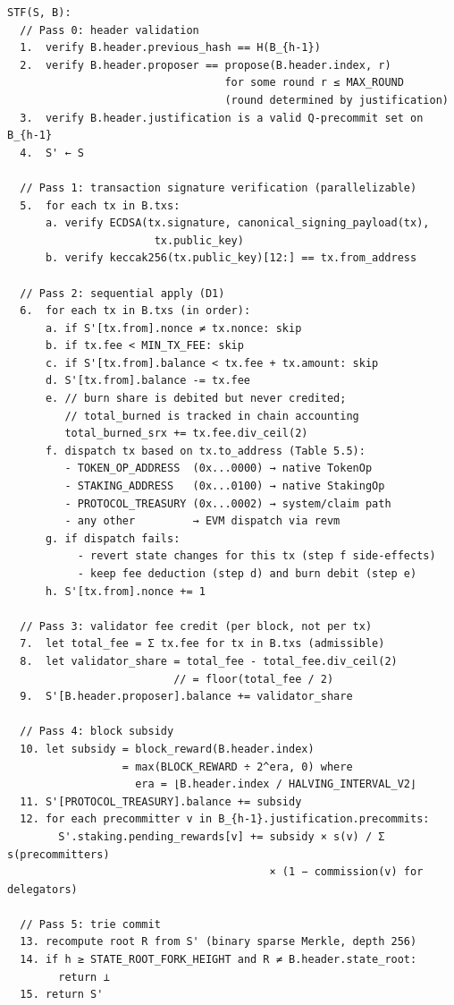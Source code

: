 \documentclass[11pt,a4paper]{article}
\begin{document}
\begin{verbatim}
STF(S, B):
  // Pass 0: header validation
  1.  verify B.header.previous_hash == H(B_{h-1})
  2.  verify B.header.proposer == propose(B.header.index, r)
                                  for some round r ≤ MAX_ROUND
                                  (round determined by justification)
  3.  verify B.header.justification is a valid Q-precommit set on B_{h-1}
  4.  S' ← S

  // Pass 1: transaction signature verification (parallelizable)
  5.  for each tx in B.txs:
      a. verify ECDSA(tx.signature, canonical_signing_payload(tx),
                       tx.public_key)
      b. verify keccak256(tx.public_key)[12:] == tx.from_address

  // Pass 2: sequential apply (D1)
  6.  for each tx in B.txs (in order):
      a. if S'[tx.from].nonce ≠ tx.nonce: skip
      b. if tx.fee < MIN_TX_FEE: skip
      c. if S'[tx.from].balance < tx.fee + tx.amount: skip
      d. S'[tx.from].balance -= tx.fee
      e. // burn share is debited but never credited;
         // total_burned is tracked in chain accounting
         total_burned_srx += tx.fee.div_ceil(2)
      f. dispatch tx based on tx.to_address (Table 5.5):
         - TOKEN_OP_ADDRESS  (0x...0000) → native TokenOp
         - STAKING_ADDRESS   (0x...0100) → native StakingOp
         - PROTOCOL_TREASURY (0x...0002) → system/claim path
         - any other         → EVM dispatch via revm
      g. if dispatch fails:
           - revert state changes for this tx (step f side-effects)
           - keep fee deduction (step d) and burn debit (step e)
      h. S'[tx.from].nonce += 1

  // Pass 3: validator fee credit (per block, not per tx)
  7.  let total_fee = Σ tx.fee for tx in B.txs (admissible)
  8.  let validator_share = total_fee - total_fee.div_ceil(2)
                          // = floor(total_fee / 2)
  9.  S'[B.header.proposer].balance += validator_share

  // Pass 4: block subsidy
  10. let subsidy = block_reward(B.header.index)
                  = max(BLOCK_REWARD ÷ 2^era, 0) where
                    era = ⌊B.header.index / HALVING_INTERVAL_V2⌋
  11. S'[PROTOCOL_TREASURY].balance += subsidy
  12. for each precommitter v in B_{h-1}.justification.precommits:
        S'.staking.pending_rewards[v] += subsidy × s(v) / Σ s(precommitters)
                                         × (1 − commission(v) for delegators)

  // Pass 5: trie commit
  13. recompute root R from S' (binary sparse Merkle, depth 256)
  14. if h ≥ STATE_ROOT_FORK_HEIGHT and R ≠ B.header.state_root:
        return ⊥
  15. return S'
\end{verbatim}
\end{document}
